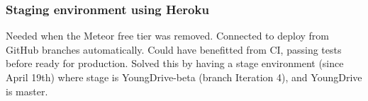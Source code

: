 \subsubsection{Staging environment using Heroku}
Needed when the Meteor free tier was removed. Connected to deploy from GitHub branches automatically. Could have benefitted from CI, passing tests before ready for production. Solved this by having a stage environment (since April 19th) where stage is YoungDrive-beta (branch Iteration 4), and YoungDrive is master.

